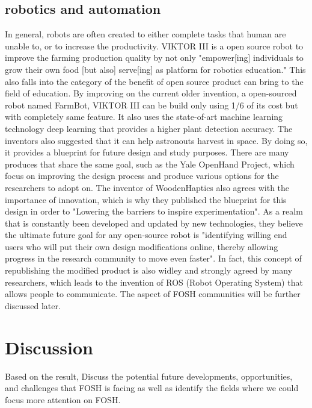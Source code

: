 \documentclass[acmtog]{acmart}
\begin{document}
\subsection{robotics and automation}
In general, robots are often created to either complete tasks that human are unable to, or to increase the productivity. VIKTOR III is a open source robot to improve the farming production quality by not only "empower[ing] individuals to grow their own food [but also] serve[ing] as platform for robotics education." This also falls into the category of the benefit of open source product can bring to the field of education. By improving on the current older invention, a open-sourced robot named FarmBot, VIKTOR III can be build only using 1/6 of its cost but with completely same feature. It also uses the state-of-art machine learning technology deep learning that provides a higher plant detection accuracy. The inventors also suggested that it can help astronouts harvest in space. By doing so, it provides a blueprint for future design and study purposes. There are many produces that share the same goal, such as the Yale OpenHand Project, which focus on improving the design process and produce various options for the researchers to adopt on.  The inventor of WoodenHaptics also agrees with the importance of innovation, which is why they published the blueprint for this design in order to "Lowering the barriers to inspire experimentation". As a realm that is constantly been developed and updated by new technologies, they believe the ultimate future goal for any open-source robot is "identifying willing end users who will put their own design modifications online, thereby allowing progress in the research community to move even faster". In fact, this concept of republishing the modified product is also widley and strongly agreed by many researchers, which leads to the invention of ROS (Robot Operating System) that allows people to communicate. The aspect of FOSH communities will be further discussed later. 




\section{Discussion}
Based on the result, Discuss the potential future developments, opportunities, and challenges that FOSH is facing as well as identify the fields where we could focus more attention on FOSH.

\end{document}
